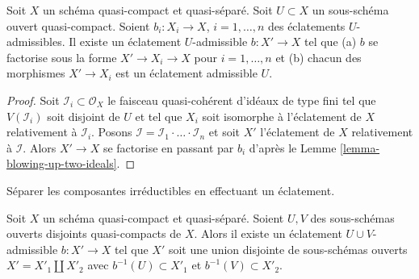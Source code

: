\begin{lemma}
\label{lemma-dominate-admissible-blowups}
Soit  $X$  un schéma quasi-compact et quasi-séparé. Soit  $U \subset X$  un
sous-schéma ouvert quasi-compact. Soient  $b_i : X_i \to X$,  $i = 1, \ldots, n$  des
éclatements  $U$-admissibles. Il existe un éclatement  $U$-admissible
 $b : X' \to X$  tel que (a)  $b$  se factorise sous la forme
 $X' \to X_i \to X$  pour  $i = 1, \ldots, n$  et (b) chacun des morphismes  $X' \to X_i$  est un
éclatement admissible  $U$.
\end{lemma}

\begin{proof}
Soit  $\mathcal{I}_i \subset \mathcal{O}_X$  le faisceau quasi-cohérent d'idéaux de type fini tel que
 $V(\mathcal{I}_i)$  soit disjoint de  $U$  et tel que  $X_i$  soit isomorphe
à l'éclatement de  $X$  relativement à  $\mathcal{I}_i$. Posons  $\mathcal{I} = \mathcal{I}_1 \cdot \ldots \cdot \mathcal{I}_n$  et soit
 $X'$  l'éclatement de  $X$  relativement à  $\mathcal{I}$. Alors  $X' \to X$  se
factorise en passant par  $b_i$  d'après le Lemme  \ref{lemma-blowing-up-two-ideals}.
\end{proof}

\begin{lemma}
\label{lemma-separate-disjoint-opens-by-blowing-up}
\begin{slogan}
Séparer les composantes irréductibles en effectuant un éclatement.
\end{slogan}
Soit  $X$  un schéma quasi-compact et quasi-séparé. Soient  $U, V$  des
sous-schémas ouverts disjoints quasi-compacts de  $X$. Alors il existe un
éclatement  $U \cup V$-admissible  $b : X' \to X$  tel que  $X'$  soit une
union disjointe de sous-schémas ouverts  $X' = X'_1 \amalg X'_2$  avec  $b^{-1}(U) \subset X'_1$  et
 $b^{-1}(V) \subset X'_2$.
\end{lemma}

